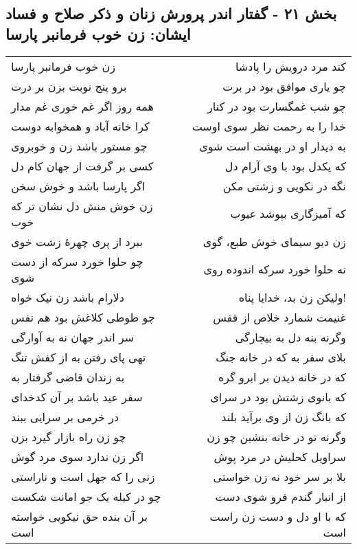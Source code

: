 \begin{center}
\section*{بخش ۲۱ - گفتار اندر پرورش زنان و ذکر صلاح و فساد ایشان: زن خوب فرمانبر پارسا}
\label{sec:021}
\begin{longtable}{l p{0.5cm} r}
زن خوب فرمانبر پارسا
&&
کند مرد درویش را پادشا
\\
برو پنج نوبت بزن بر درت
&&
چو یاری موافق بود در برت
\\
همه روز اگر غم خوری غم مدار
&&
چو شب غمگسارت بود در کنار
\\
کرا خانه آباد و همخوابه دوست
&&
خدا را به رحمت نظر سوی اوست
\\
چو مستور باشد زن و خوبروی
&&
به دیدار او در بهشت است شوی
\\
کسی بر گرفت از جهان کام دل
&&
که یکدل بود با وی آرام دل
\\
اگر پارسا باشد و خوش سخن
&&
نگه در نکویی و زشتی مکن
\\
زن خوش منش دل نشان تر که خوب
&&
که آمیزگاری بپوشد عیوب
\\
ببرد از پری چهرهٔ زشت خوی
&&
زن دیو سیمای خوش طبع، گوی
\\
چو حلوا خورد سرکه از دست شوی
&&
نه حلوا خورد سرکه اندوده روی
\\
دلارام باشد زن نیک خواه
&&
ولیکن زن بد، خدایا پناه!
\\
چو طوطی کلاغش بود هم نفس
&&
غنیمت شمارد خلاص از قفس
\\
سر اندر جهان نه به آوارگی
&&
وگرنه بنه دل به بیچارگی
\\
تهی پای رفتن به از کفش تنگ
&&
بلای سفر به که در خانه جنگ
\\
به زندان قاضی گرفتار به
&&
که در خانه دیدن بر ابرو گره
\\
سفر عید باشد بر آن کدخدای
&&
که بانوی زشتش بود در سرای
\\
در خرمی بر سرایی ببند
&&
که بانگ زن از وی برآید بلند
\\
چو زن راه بازار گیرد بزن
&&
وگرنه تو در خانه بنشین چو زن
\\
اگر زن ندارد سوی مرد گوش
&&
سراویل کحلیش در مرد پوش
\\
زنی را که جهل است و ناراستی
&&
بلا بر سر خود نه زن خواستی
\\
چو در کیله یک جو امانت شکست
&&
از انبار گندم فرو شوی دست
\\
بر آن بنده حق نیکویی خواسته است
&&
که با او دل و دست زن راست است
\\

\end{longtable}
\end{center}
